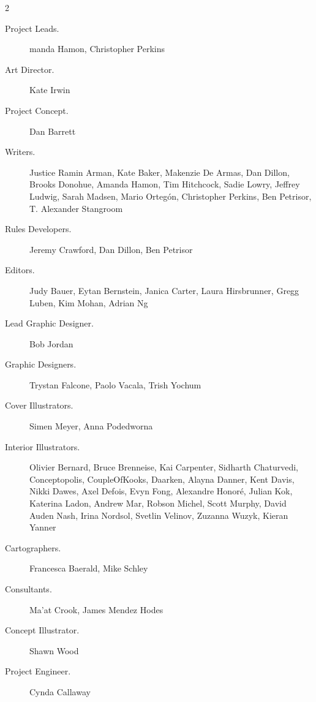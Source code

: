 \documentclass[10pt,a4paper,twoside,bg=print,twocolumn,openany,nodeprecatedcode]{dndbook}
\begin{document}
\begin{description}
\begin{multicols}{2}

\begin{description}
\item[Project Leads.]
manda Hamon, Christopher Perkins


\item[Art Director.]
Kate Irwin

\item[Project Concept.]
Dan Barrett

\item[Writers.]
Justice Ramin Arman, Kate Baker, Makenzie De Armas, Dan Dillon, Brooks Donohue, Amanda Hamon, Tim Hitchcock, Sadie Lowry, Jeffrey Ludwig, Sarah Madsen, Mario Ortegón, Christopher Perkins, Ben Petrisor, T. Alexander Stangroom

\item[Rules Developers.]
Jeremy Crawford, Dan Dillon, Ben Petrisor

\item[Editors.]
Judy Bauer, Eytan Bernstein, Janica Carter, Laura Hirsbrunner, Gregg Luben, Kim Mohan, Adrian Ng

\item[Lead Graphic Designer.]
Bob Jordan

\item[Graphic Designers.]
Trystan Falcone, Paolo Vacala, Trish Yochum

\item[Cover Illustrators.]
Simen Meyer, Anna Podedworna

\item[Interior Illustrators.]
Olivier Bernard, Bruce Brenneise, Kai Carpenter, Sidharth Chaturvedi, Conceptopolis, CoupleOfKooks, Daarken, Alayna Danner, Kent Davis, Nikki Dawes, Axel Defois, Evyn Fong, Alexandre Honoré, Julian Kok, Katerina Ladon, Andrew Mar, Robson Michel, Scott Murphy, David Auden Nash, Irina Nordsol, Svetlin Velinov, Zuzanna Wuzyk, Kieran Yanner

\item[Cartographers.]
Francesca Baerald, Mike Schley

\item[Consultants.]
Ma'at Crook, James Mendez Hodes

\item[Concept Illustrator.]
Shawn Wood

\item[Project Engineer.]
Cynda Callaway


\end{description}
\end{multicols}
\end{description}
\end{document}

